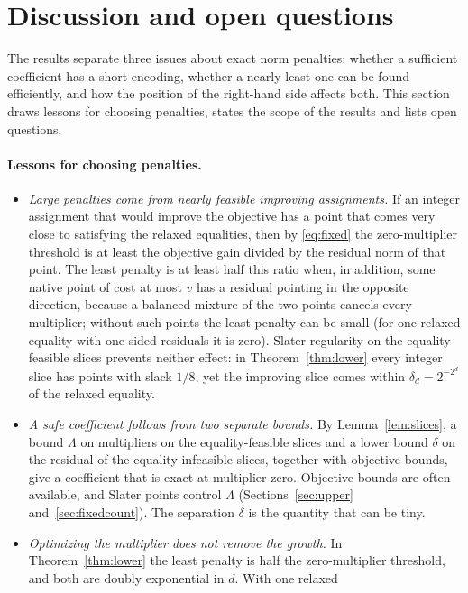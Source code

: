 \section{Discussion and open questions}\label{sec:discussion}
The results separate three issues about exact norm penalties: whether a
sufficient coefficient has a short encoding, whether a nearly least one
can be found efficiently, and how the position of the right-hand side
affects both. This section draws lessons for choosing penalties, states
the scope of the results and lists open questions.

\paragraph{Lessons for choosing penalties.}
\begin{itemize}
\item \emph{Large penalties come from nearly feasible improving
 assignments.} If an integer assignment that would improve the objective
 has a point that comes very close to satisfying the relaxed equalities,
 then by \eqref{eq:fixed} the zero-multiplier threshold is at least the
 objective gain divided by the residual norm of that point. The least
 penalty is at least half this ratio when, in addition, some native point
 of cost at most $v$ has a residual pointing in the opposite direction,
 because a balanced mixture of the two points cancels every multiplier;
 without such points the least penalty can be small (for one relaxed
 equality with one-sided residuals it is zero). Slater regularity on the
 equality-feasible slices prevents neither effect: in
 Theorem~\ref{thm:lower} every integer slice has points with slack $1/8$,
 yet the improving slice comes within $\delta_d=2^{-2^d}$ of the relaxed
 equality.
\item \emph{A safe coefficient follows from two separate bounds.} By
 Lemma~\ref{lem:slices}, a bound $\Lambda$ on multipliers on the
 equality-feasible slices and a lower bound $\delta$ on the residual of
 the equality-infeasible slices, together with objective bounds, give a
 coefficient that is exact at multiplier zero. Objective bounds are often
 available, and Slater points control $\Lambda$
 (Sections~\ref{sec:upper} and~\ref{sec:fixedcount}). The separation
 $\delta$ is the quantity that can be tiny.
\item \emph{Optimizing the multiplier does not remove the growth.} In
 Theorem~\ref{thm:lower} the least penalty is half the zero-multiplier
 threshold, and both are doubly exponential in $d$. With one relaxed

\end{itemize}
